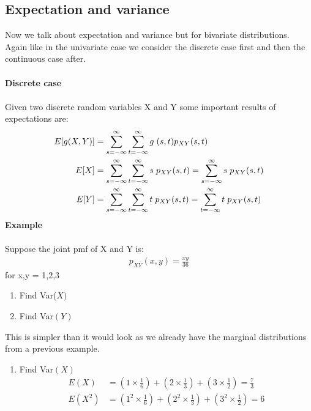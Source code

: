 \documentclass[,oneside]{article}
\begin{document}
\begin{enumerate}
\subsection{Expectation and variance}
Now we talk about expectation and variance but for bivariate distributions. Again like in the univariate case we consider the discrete case first and then the continuous case after.\\ \\
\textbf{Discrete case}\\ \\
Given two discrete random variables X and Y some important results of expectations are:
\begin{align*}
E[g(X,Y)]&=\sum_{s=-\infty}^{\infty} \sum_{t=-\infty}^{\infty} g\hspace{0.1cm}(s,t)p_{XY}(s,t)\\
E[X]&=\sum_{s=-\infty}^{\infty} \sum_{t=-\infty}^{\infty} s\hspace{0.1cm} p_{XY}(s,t)=\sum_{s=-\infty}^{\infty} s\hspace{0.1cm} p_{XY}(s,t)\\
E[Y]&=\sum_{s=-\infty}^{\infty} \sum_{t=-\infty}^{\infty} t\hspace{0.1cm} p_{XY}(s,t)=\sum_{t=-\infty}^{\infty} t\hspace{0.1cm} p_{XY}(s,t)
\end{align*}
\textbf{Example}\\ \\
Suppose the joint pmf of X and Y is:
\begin{align*}
p_{XY}(x,y)=\frac{xy}{36}
\end{align*}
for x,y = 1,2,3\\ 
\begin{enumerate}
\item Find Var($X)$
\item Find Var$(Y)$
\end{enumerate}
This is simpler than it would look as we already have the marginal distributions from a previous example.\\
\begin{enumerate}
\item Find Var$(X)$
\begin{align*}
E(X)&=\left ( 1 \times \frac{1}{6}\right ) + \left ( 2 \times \frac{1}{3}\right ) + \left ( 3 \times \frac{1}{2}\right ) = \frac{7}{3}\\
E(X^2)&= \left ( 1^2 \times \frac{1}{6}\right ) + \left ( 2^2 \times \frac{1}{3}\right ) + \left ( 3^2 \times \frac{1}{2}\right ) =6\\

\end{align*}
\end{enumerate}
\end{enumerate}
\end{document}
